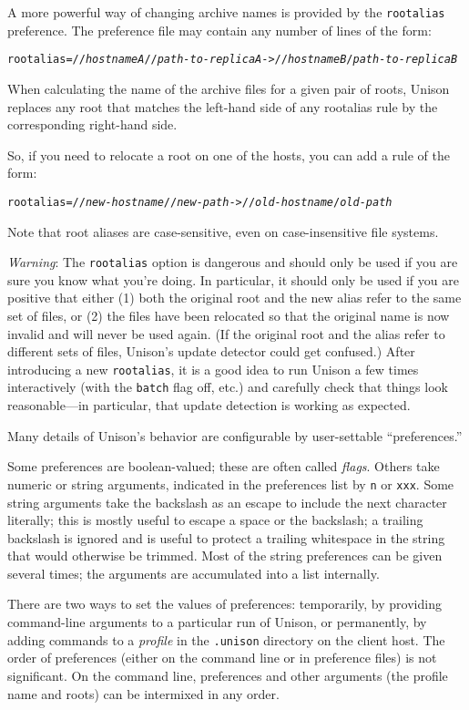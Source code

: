 \documentclass{article}
\newcommand{\NT}[1]{\textit{#1}}
\begin{document}
A more powerful way of changing archive names is provided by the
\verb|rootalias| preference.  The preference file may contain any number of
lines of the form:
\begin{alltt}
    rootalias = //\NT{hostnameA}//\NT{path-to-replicaA} -> //\NT{hostnameB}/\NT{path-to-replicaB}
\end{alltt}
When calculating the name of the archive files for a given pair of roots,
Unison replaces any root that matches the left-hand side of any rootalias
rule by the corresponding right-hand side.

So, if you need to relocate a root on one of the hosts, you can add a
rule of the form:
\begin{alltt}
    rootalias = //\NT{new-hostname}//\NT{new-path} -> //\NT{old-hostname}/\NT{old-path}
\end{alltt}
Note that root aliases are case-sensitive, even on case-insensitive file
systems.

{\em Warning}: The \verb|rootalias| option is dangerous and should only
be used if you are sure you know what you're doing.  In particular, it
should only be used if you are positive that either (1) both the original
root and the new alias refer to the same set of files, or (2) the files
have been relocated so that the original name is now invalid and will
never be used again.  (If the original root and the alias refer to
different sets of files, Unison's update detector could get confused.)
%
After introducing a new \verb|rootalias|, it is a good idea to run Unison
a few times interactively (with the \verb|batch| flag off, etc.) and
carefully check that things look reasonable---in particular, that update
detection is working as expected.



Many details of Unison's behavior are configurable by user-settable
``preferences.''

Some preferences are boolean-valued; these are often called {\em flags}.
Others take numeric or string arguments, indicated in the preferences
list by {\tt n} or {\tt xxx}.  Some string arguments take the backslash as
an escape to include the next character literally; this is mostly useful
to escape a space or the backslash; a trailing backslash is ignored and is
useful to protect a trailing whitespace in the string that would otherwise
be trimmed.  Most of the string preferences can be given several times;
the arguments are accumulated into a list internally.

There are two ways to set the values of preferences: temporarily, by
providing command-line arguments to a particular run of Unison, or
permanently, by adding commands to a {\em profile} in the {\tt .unison}
directory on the client host.  The order of preferences (either on the
command line or in preference files) is not significant.  On the command
line, preferences and other arguments (the profile name and roots) can be
intermixed in any order.
\end{document}
